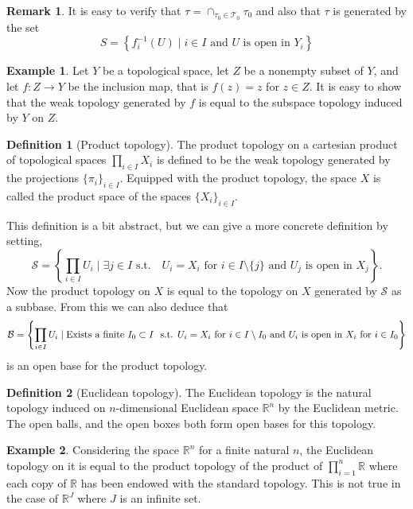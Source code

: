 \documentclass[11pt,a4paper]{article}
\theoremstyle{definition}
\newtheorem{definition}{Definition}[section]
\newtheorem{remark}{Remark}[section]
\newtheorem{example}{Example}[section]
\theoremstyle{plain}
\newcommand{\st}{\text{ s.t. }}
\newcommand{\R}{\mathbb{R}}
\newcommand{\set}[2]{ \left\{ #1 \mid #2 \right\} }
\begin{document}
  \begin{remark}
  It is easy to verify that $\tau = \cap_{\tau_0 \in \mathcal{T}_0}{\tau_0}$
  and also that $\tau$ is generated by the set
  \[
    S = \set{f_i^{-1}(U)}{i \in I \text{ and $U$ is open in $Y_i$}}
  \]
  \end{remark}

  \begin{example}
    Let $Y$ be a topological space, let $Z$ be a nonempty subset of $Y$,
    and let $f \colon Z \to Y$ be the inclusion map, that is $f(z) = z$ 
    for $z \in Z$. It is easy to show that the weak topology generated by $f$ 
    is equal to the subspace topology induced by $Y$ on $Z$.
  \end{example}

  \begin{definition}[Product topology]
    The product topology on a cartesian product of topological spaces
    $\prod_{i \in I} X_i$ is defined to be the weak topology generated by
    the projections $\{\pi_i\}_{i \in I}$. Equipped with the product
    topology, the space $X$ is called the product space of the spaces
    $\{X_i\}_{i \in I}$.
  \end{definition}

  This definition is a bit abstract, but we can give a more concrete 
  definition by setting,
  \[
    \mathcal{S} = \set{\prod_{i \in I}{U_i}}{\exists j \in I \st 
    \text{ $U_i = X_i$ for $i \in I \setminus \{j\}$ and $U_j$ is open in
    $X_j$}}.
  \]
  Now the product topology on $X$ is equal to the topology on $X$ generated
  by $\mathcal{S}$ as a subbase. From this we can also deduce that
  {\small
  \[
    \mathcal{B} = \set{\prod_{i \in I}U_i}{\text{Exists a finite
    $I_0 \subset I$ \st $U_i = X_i$ for $i \in I \setminus I_0$ and
    $U_i$ is open in $X_i$ for $i \in I_0$}}
  \]
  }
  is an open base for the product topology.

  \begin{definition}[Euclidean topology]
    The Euclidean topology is the natural topology induced on $n$-dimensional 
    Euclidean space $\R^n$ by the Euclidean metric. The open balls, and
    the open boxes both form open bases for this topology.
  \end{definition}

  \begin{example}
    Considering the space $\R^n$ for a finite natural $n$, the Euclidean
    topology on it is equal to the product topology of the product of
    $\prod_{i=1}^{n} \R$ where each copy of $\R$ has been endowed with
    the standard topology. This is not true in the case of $\R^J$ where
    $J$ is an infinite set.
  \end{example}
\end{document}

